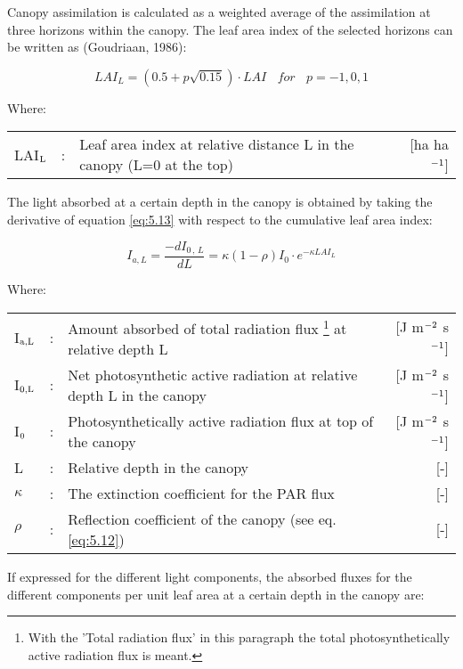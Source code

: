 Canopy assimilation is calculated as a weighted average of the assimilation at three
horizons within the canopy. The leaf area index of the selected horizons can be written as
(Goudriaan, 1986):

\begin{equation}
LAI_{L} = (0.5 + p \sqrt{0.15}) \cdot LAI~~~~for~~~~p = -1,0,1
\end{equation}

 
Where:\\[5pt]
\begin{tabularx}{\textwidth}{llXr}
LAI$_{{\rm L}}$ &:& Leaf area index at relative distance L in the canopy 
    (L=0 at the top)    &    [ha ha$^{{\rm -1}}$]\\
\end{tabularx}

The light absorbed at a certain depth in the canopy is obtained by taking the derivative of
equation \ref{eq:5.13} with respect to the cumulative leaf area index:

\begin{equation}
I_{a,L} = {\frac{-dI _{0\, ,\, L} }{dL}} = \kappa (1 -  \rho) I_{0} \cdot e^{- \kappa LAI_{L}}
\end{equation}

Where:\\[5pt]
\begin{tabularx}{\textwidth}{llXr}
I$_{{\rm a,L}}$ &:& Amount absorbed of total radiation flux
    \footnote{With the 'Total radiation flux' in this paragraph the total photosynthetically 
        active radiation flux is meant.} at relative depth L    &    
    [J m$^{{\rm -2}}$ s$^{{\rm -1}}$]\\
I$_{{\rm 0,L}}$ &:& Net photosynthetic active radiation at relative depth L in 
    the canopy    &    [J m$^{{\rm -2}}$ s$^{{\rm -1}}$]\\
I$_{{\rm 0}}$ &:& Photosynthetically active radiation flux at top of the 
    canopy   &     [J m$^{{\rm -2}}$ s$^{{\rm -1}}$]\\
L &:& Relative depth in the canopy   &     [-]\\
$\kappa$ &:& The extinction coefficient for the PAR flux    &     [-]\\
$\rho$ &:& Reflection coefficient of the canopy (see eq. \ref{eq:5.12})   &     [-]\\
\end{tabularx}

If expressed for the different light components, the absorbed fluxes for the different
components per unit leaf area at a certain depth in the canopy are:


